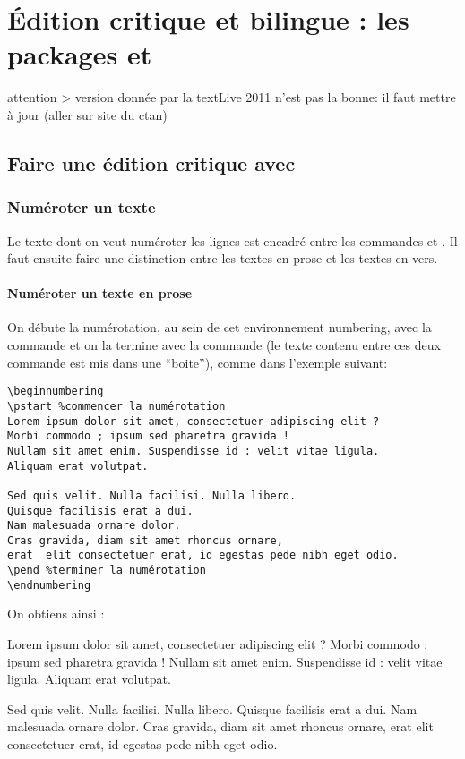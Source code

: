 \chapter{Édition critique et bilingue : les packages  et }
\label{ledmac}

attention > version donnée par la textLive 2011 n'est pas la bonne: il faut mettre à jour  (aller sur site du ctan)

\section{Faire une édition critique avec }

\subsection{Numéroter un texte}

Le texte dont on veut numéroter les lignes est encadré entre les commandes  et . Il faut ensuite faire une distinction entre les textes en prose et les textes en vers. 

\subsubsection{Numéroter un texte en prose}


On débute la numérotation, au sein de cet environnement numbering, avec la commande  et on la termine avec la commande  (le texte contenu entre ces deux commande est mis dans une \enquote{boite}), comme dans l'exemple suivant:

\begin{verbatim}
\beginnumbering
\pstart %commencer la numérotation
Lorem ipsum dolor sit amet, consectetuer adipiscing elit ?
Morbi commodo ; ipsum sed pharetra gravida !
Nullam sit amet enim. Suspendisse id : velit vitae ligula.
Aliquam erat volutpat.

Sed quis velit. Nulla facilisi. Nulla libero. 
Quisque facilisis erat a dui. 
Nam malesuada ornare dolor.
Cras gravida, diam sit amet rhoncus ornare, 
erat  elit consectetuer erat, id egestas pede nibh eget odio.
\pend %terminer la numérotation
\endnumbering
\end{verbatim}

On obtiens ainsi : 

\begin{minipage}{10cm}
\beginnumbering
\pstart %
Lorem ipsum dolor sit amet, consectetuer adipiscing elit ?
Morbi commodo ; ipsum sed pharetra gravida !
Nullam sit amet enim. Suspendisse id : velit vitae ligula. 
Aliquam erat volutpat.\pend

Sed quis velit. Nulla facilisi. Nulla libero. 
 Quisque facilisis erat a dui. %
Nam malesuada ornare dolor.
Cras gravida, diam sit amet rhoncus ornare, 
erat  elit consectetuer erat, id egestas pede nibh eget odio.
\pend
\endnumbering
\end{minipage}

